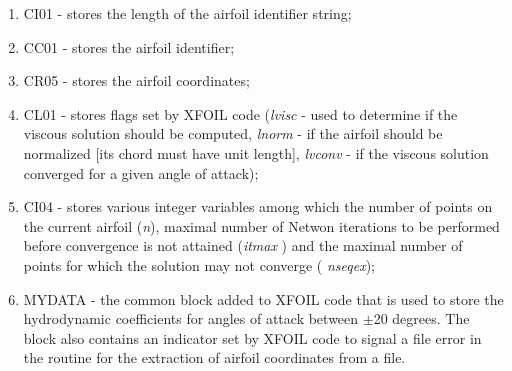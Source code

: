 \begin{enumerate}[topsep=5pt, partopsep=0pt,itemsep=3pt,parsep=1pt]
\item CI01 - stores the length of the airfoil identifier string;

\item CC01 - stores the airfoil identifier;

\item CR05 - stores the airfoil coordinates;

\item CL01 - stores flags set by XFOIL code (\textit{lvisc} - used to
determine if the viscous solution should be computed, \textit{lnorm} - if
the airfoil should be normalized [its chord must have unit length], \textit{%
lvconv} - if the viscous solution converged for a given angle of attack);

\item CI04 - stores various integer variables among which the number of
points on the current airfoil (\textit{n}), maximal number of Netwon
iterations to be performed before convergence is not attained (\textit{itmax}%
) and the maximal number of points for which the solution may not converge (%
\textit{nseqex});

\item MYDATA - the common block added to XFOIL code that is used to store
the hydrodynamic coefficients for angles of attack between $\pm $20 degrees.
The block also contains an indicator set by XFOIL code to signal a file
error in the routine for the extraction of airfoil coordinates from a file.
\end{enumerate}

